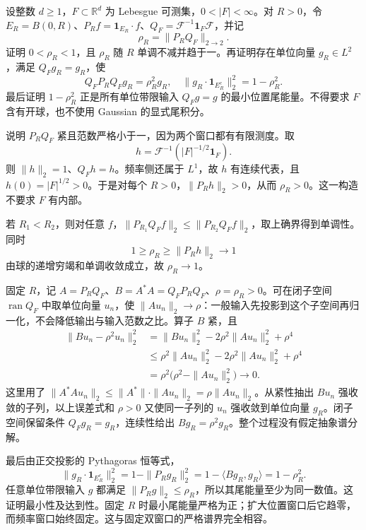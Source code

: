 \begin{optionalexercise}\label{b2:ex:20-new-8}
设整数 \(d\geq1\)，\(F\subset\mathbb R^d\) 为 Lebesgue 可测集，\(0<|F|<\infty\)。对 \(R>0\)，令 \(E_R=B(0,R)\)、\(P_Rf=\mathbf1_{E_R}\cdot f\)、\(Q_F=\mathcal F^{-1}\mathbf1_F\mathcal F\)，并记
\[
 \rho_R=\|P_RQ_F\|_{2\to2}.
\]
证明 \(0<\rho_R<1\)，且 \(\rho_R\) 随 \(R\) 单调不减并趋于一。再证明存在单位向量 \(g_R\in L^2\)，满足 \(Q_Fg_R=g_R\)，使
\[
 Q_FP_RQ_Fg_R=\rho_R^2g_R,
 \quad
 \|g_R\cdot\mathbf1_{E_R^c}\|_2^2=1-\rho_R^2.
\]
最后证明 \(1-\rho_R^2\) 正是所有单位带限输入 \(Q_Fg=g\) 的最小位置尾能量。不得要求 \(F\) 含有开球，也不使用 Gaussian 的显式尾积分。
\end{optionalexercise}
\begin{solution}
说明 \(P_RQ_F\) 紧且范数严格小于一，因为两个窗口都有有限测度。取
\[
 h=\mathcal F^{-1}\left(|F|^{-1/2}\mathbf1_F\right).
\]
则 \(\|h\|_2=1\)、\(Q_Fh=h\)。频率侧还属于 \(L^1\)，故 \(h\) 有连续代表，且 \(h(0)=|F|^{1/2}>0\)。于是对每个 \(R>0\)，\(\|P_Rh\|_2>0\)，从而 \(\rho_R>0\)。这一构造不要求 \(F\) 有内部。

若 \(R_1<R_2\)，则对任意 \(f\)，\(\|P_{R_1}Q_Ff\|_2\leq\|P_{R_2}Q_Ff\|_2\)，取上确界得到单调性。同时
\[
 1\geq\rho_R\geq\|P_Rh\|_2\longrightarrow1
\]
由球的递增穷竭和单调收敛成立，故 \(\rho_R\to1\)。

固定 \(R\)，记 \(A=P_RQ_F\)、\(B=A^*A=Q_FP_RQ_F\)、\(\rho=\rho_R>0\)。可在闭子空间 \(\operatorname{ran}Q_F\) 中取单位向量 \(u_n\)，使 \(\|Au_n\|_2\to\rho\)：一般输入先投影到这个子空间再归一化，不会降低输出与输入范数之比。算子 \(B\) 紧，且
\[
 \begin{aligned}
 \|Bu_n-\rho^2u_n\|_2^2
 &=\|Bu_n\|_2^2-2\rho^2\|Au_n\|_2^2+\rho^4\\
 &\leq\rho^2\|Au_n\|_2^2
              -2\rho^2\|Au_n\|_2^2+\rho^4\\
 &=\rho^2\bigl(\rho^2-\|Au_n\|_2^2\bigr)\longrightarrow0.
 \end{aligned}
\]
这里用了 \(\|A^*Au_n\|_2\leq\|A^*\|\cdot\|Au_n\|_2=\rho\|Au_n\|_2\)。从紧性抽出 \(Bu_n\) 强收敛的子列，以上误差式和 \(\rho>0\) 又使同一子列的 \(u_n\) 强收敛到单位向量 \(g_R\)。闭子空间保留条件 \(Q_Fg_R=g_R\)，连续性给出 \(Bg_R=\rho^2g_R\)。整个过程没有假定抽象谱分解。

最后由正交投影的 Pythagoras 恒等式，
\[
 \|g_R\cdot\mathbf1_{E_R^c}\|_2^2
 =1-\|P_Rg_R\|_2^2
 =1-\langle Bg_R,g_R\rangle
 =1-\rho_R^2.
\]
任意单位带限输入 \(g\) 都满足 \(\|P_Rg\|_2\leq\rho_R\)，所以其尾能量至少为同一数值。这证明最小性及达到性。固定 \(R\) 时最小尾能量严格为正；扩大位置窗口后它趋零，而频率窗口始终固定。这与固定双窗口的严格谱界完全相容。
\end{solution}
